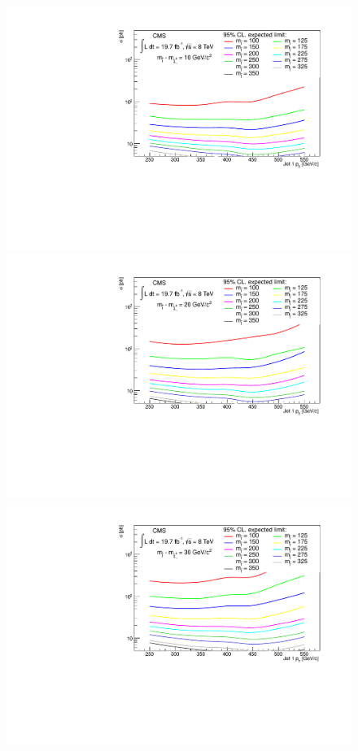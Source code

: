 \begin{figure}[!Hhtb]
  \begin{center}
  \includegraphics[scale=0.39]{Figures/sus13009/limits/optimisation_Limit_10.pdf}
  \includegraphics[scale=0.39]{Figures/sus13009/limits/optimisation_Limit_20.pdf}
  \includegraphics[scale=0.39]{Figures/sus13009/limits/optimisation_Limit_30.pdf}

\end{center}
\end{figure}
